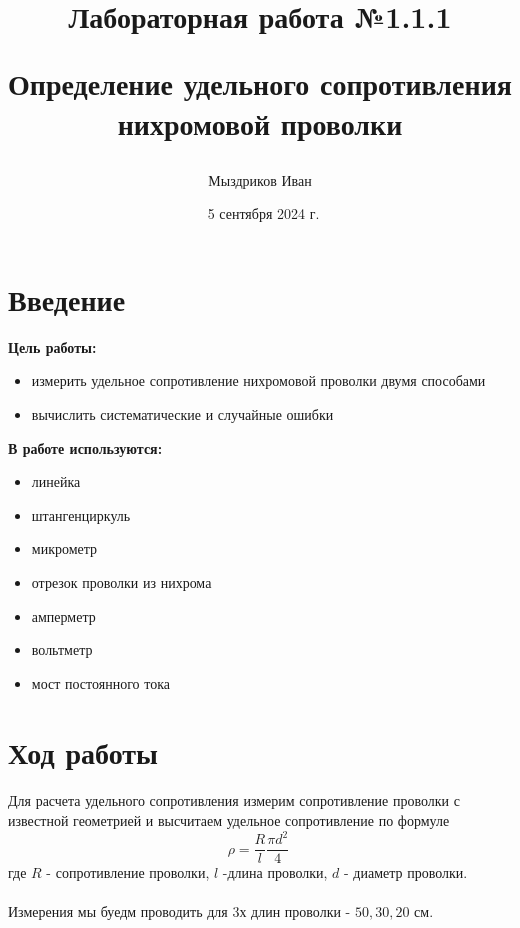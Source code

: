 \documentclass[a4paper,12pt]{article}
\title{\begin{center}Лабораторная работа №1.1.1\end{center}
Определение удельного сопротивления нихромовой проволки}
\author{Мыздриков Иван}
\date{\ 5 сентября 2024 г.}
\begin{document}
    \maketitle
    \newpage

    \section{Введение}
    \textbf{Цель работы:}
    \begin{itemize}
        \item измерить удельное сопротивление нихромовой проволки двумя способами
        \item вычислить систематические и случайные ошибки
    \end{itemize}

    \vspace{1cm}

    \textbf{В работе используются: }
    \begin{itemize}
        \item линейка
        \item штангенциркуль
        \item микрометр
        \item отрезок проволки из нихрома
        \item амперметр
        \item вольтметр
        \item мост постоянного тока
    \end{itemize}

    \newpage
    \section{Ход работы}
    \paragraph{}
    Для расчета удельного сопротивления измерим сопротивление проволки с известной геометрией и высчитаем удельное сопротивление по формуле
    \begin{equation}
        \rho = \frac{R}{l}\frac{\pi d^{2}}{4}\
    \end{equation}
    где $R$ - сопротивление проволки, $l$ -длина проволки, $d$ - диаметр проволки.

    \paragraph{}
    Измерения мы буедм проводить для 3х длин проволки - $50, 30, 20$ $см$.
\end{document}
